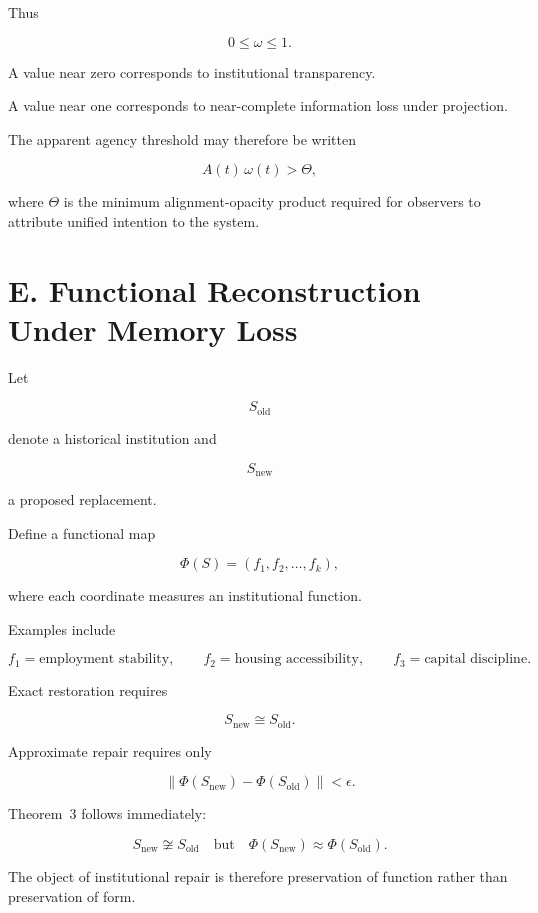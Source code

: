 \documentclass[12pt, a4paper]{article}
\theoremstyle{named}
\begin{document}
Thus

\[
0 \le \omega \le 1.
\]

A value near zero corresponds to institutional transparency.

A value near one corresponds to near-complete information loss under
projection.

The apparent agency threshold may therefore be written

\[
A(t)\,\omega(t)
>
\Theta,
\]

where $\Theta$ is the minimum alignment-opacity product required for
observers to attribute unified intention to the system.

\section{E. Functional Reconstruction Under Memory Loss}

Let

\[
S_{\mathrm{old}}
\]

denote a historical institution and

\[
S_{\mathrm{new}}
\]

a proposed replacement.

Define a functional map

\[
\Phi(S)
=
(f_1,f_2,\ldots,f_k),
\]

where each coordinate measures an institutional function.

Examples include

\[
f_1
=
\text{employment stability},
\qquad
f_2
=
\text{housing accessibility},
\qquad
f_3
=
\text{capital discipline}.
\]

Exact restoration requires

\[
S_{\mathrm{new}}
\cong
S_{\mathrm{old}}.
\]

Approximate repair requires only

\[
\|
\Phi(S_{\mathrm{new}})
-
\Phi(S_{\mathrm{old}})
\|
<
\epsilon.
\]

Theorem~3 follows immediately:

\[
S_{\mathrm{new}}
\not\cong
S_{\mathrm{old}}
\quad\text{but}\quad
\Phi(S_{\mathrm{new}})
\approx
\Phi(S_{\mathrm{old}}).
\]

The object of institutional repair is therefore preservation of function rather than preservation of form.

\newpage
\end{document}
